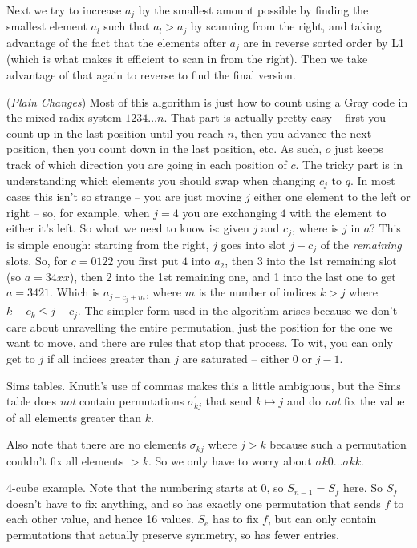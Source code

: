 Next we try to increase $a_j$ by the smallest amount possible by finding
the smallest element $a_l$ such that $a_l > a_j$ by scanning from the right,
and taking advantage of the fact that the elements after $a_j$ are in
reverse sorted order by L1 (which is what makes it efficient to scan
in from the right).  Then we take advantage of that again to reverse to find the
final version.

\vskip 0.08in
 ({\it Plain Changes})\hfil\break
Most of this algorithm is just how to count using a Gray code in the
mixed radix system $1 2 3 4 \ldots n$.  That part is actually pretty easy --
first you count up in the last position until you reach $n$, then you advance
the next position, then you count down in the last position, etc.  As such,
$o$ just keeps track of which direction you are going in each position of $c$.
The tricky part is in understanding which elements you should swap when
changing $c_j$ to $q$.  In most cases this isn't so strange -- you are just
moving $j$ either one element to the left or right -- so, for example, when 
$j = 4$ you are exchanging $4$ with the element to either it's left.  
So what we need to know is: given $j$ and $c_j$, where is $j$ in
$a$?  This is simple enough: starting from the right, $j$ goes into
slot $j - c_{j}$ of the {\it remaining} slots.  So, for $c=0122$
you first put $4$ into $a_2$, then 3 into the 1st remaining slot
(so $a = 34xx$), then 2 into the 1st remaining one, and 1 into
the last one to get $a=3421$.  Which is $a_{j - c_j + m}$,
where $m$ is the number of indices $k > j$ where 
$k - c_k \le j - c_j$.  The simpler form used in the algorithm
arises because we don't care about unravelling the entire
permutation, just the position for the one we want to move,
and there are rules that stop that process.  To wit, you can
only get to $j$ if all indices greater than $j$ are saturated --
either 0 or $j-1$.



\noindent [p 327] Sims tables.\hfil\break
Knuth's use of commas makes this a little ambiguous, but the Sims table
does {\it not} contain permutations $\sigma^{\prime}_{kj}$ that send
$k \mapsto j$ and do {\it not} fix the value of all elements greater than $k$.

Also note that there are no elements $\sigma_{kj}$ where $j > k$
because such a permutation couldn't fix all elements $> k$.  So
we only have to worry about $\sigma{k0} \ldots \sigma{kk}$.

 4-cube example.\hfil\break
Note that the numbering starts at 0, so $S_{n-1} = S_f$ here.  So $S_f$
doesn't have to fix anything, and so has exactly one permutation that sends
$f$ to each other value, and hence 16 values.  $S_e$ has to fix $f$, but
can only contain permutations that actually preserve symmetry, so has
fewer entries.

